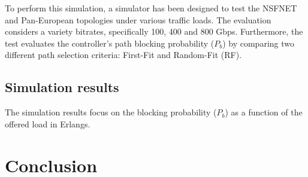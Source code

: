\documentclass[conference]{IEEEtran}
\begin{document}
To perform this simulation, a simulator has been designed to test the NSFNET and Pan-European topologies under various traffic loads. The evaluation considers a variety bitrates, specifically 100, 400 and 800 Gbps. Furthermore, the test evaluates the controller's path blocking probability ($P_b$) by comparing two different path selection criteria: First-Fit and Random-Fit (RF).
\subsection{Simulation results}
The simulation results focus on the blocking probability ($P_b$) as a function of the offered load in Erlangs.
\section{Conclusion} %


\end{document}
